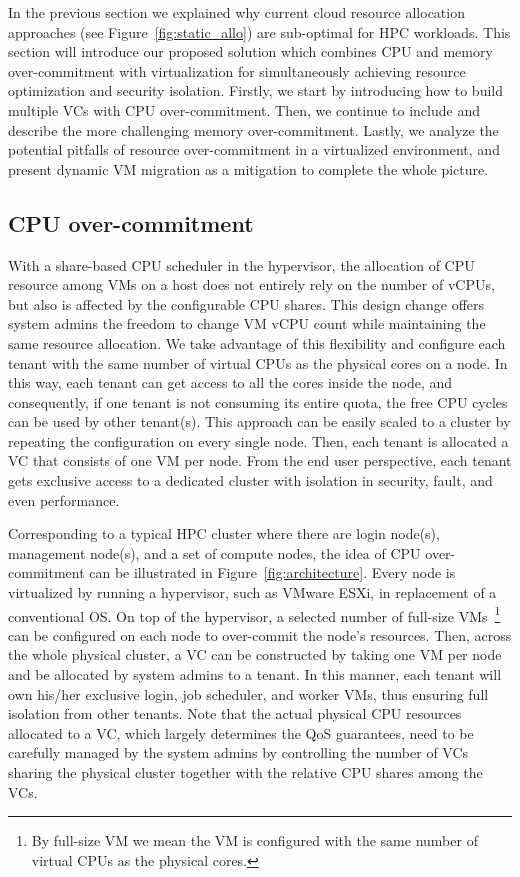 In the previous section we explained why current cloud resource allocation approaches 
(see Figure~\ref{fig:static_allo}) 
are sub-optimal for HPC workloads. This section will introduce our proposed solution which combines 
CPU and memory over-commitment with virtualization for simultaneously achieving resource optimization and security isolation. Firstly, we start by introducing how to build multiple VCs with CPU over-commitment. Then, we continue to include and describe the more challenging memory over-commitment. Lastly, we analyze the 
potential pitfalls of resource over-commitment in a virtualized environment, 
and present dynamic VM migration as a mitigation to complete the whole picture.



\subsection{CPU over-commitment}
With a share-based CPU scheduler in the hypervisor, the allocation of CPU resource among VMs on a host does not entirely rely on the number of vCPUs, but also is affected by the configurable CPU shares. 
This design change offers system admins the freedom to 
change VM vCPU count while maintaining the same resource allocation. We take advantage of this 
flexibility and configure each tenant with the same number of virtual CPUs as the physical cores 
on a node. In this way, each tenant can get access to all the cores inside the node, and consequently, if one tenant 
is not consuming its entire quota, the free CPU cycles can be used by other tenant(s). 
This approach can be easily scaled to a cluster by repeating the configuration on every 
single node. Then, each tenant is allocated a VC that consists of one VM per node. From the end user 
perspective, each tenant gets exclusive access to a dedicated cluster with isolation in security, fault, and even performance.  

Corresponding to a typical HPC cluster where there are login node(s), management node(s), 
and a set of compute nodes, the idea of CPU over-commitment can be illustrated in 
Figure~\ref{fig:architecture}. Every node is virtualized by running a hypervisor, 
such as VMware ESXi, in replacement of a conventional OS. On top of the hypervisor, 
a selected number of full-size VMs~\footnote{By full-size VM we mean the VM is configured with the same number of virtual CPUs as the physical cores.} 
can be configured on each node to over-commit the 
node's resources. Then, across the whole physical cluster, a VC
can be constructed by taking one VM per node and be allocated by system admins  
to a tenant. %
In this manner, each tenant will own his/her exclusive login, job scheduler, and worker VMs, thus ensuring full isolation from other tenants. 
Note that the actual physical 
CPU resources allocated to a VC, which largely determines the QoS guarantees, need to be 
carefully managed by the system admins by controlling the number of VCs sharing the physical cluster 
together with the relative CPU shares among the VCs.  

